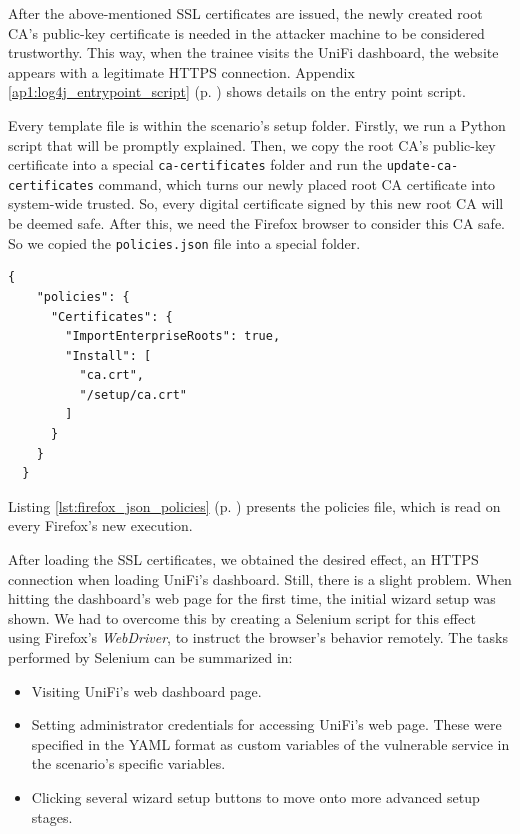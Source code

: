 
After the above-mentioned SSL certificates are issued, the newly created root CA's public-key certificate is needed in the attacker machine to be considered trustworthy. This way, when the trainee visits the UniFi dashboard, the website appears with a legitimate HTTPS connection. Appendix \ref{ap1:log4j_entrypoint_script} (p. \pageref{ap1:log4j_entrypoint_script}) shows details on the entry point script.

Every template file is within the scenario's setup folder. Firstly, we run a Python script that will be promptly explained. Then, we copy the root CA's public-key certificate into a special \texttt{ca-certificates} folder and run the \texttt{update-ca-certificates} command, which turns our newly placed root CA certificate into system-wide trusted. So, every digital certificate signed by this new root CA will be deemed safe. After this, we need the Firefox browser to consider this CA safe. So we copied the \texttt{policies.json} file into a special folder.

\begin{lstlisting}[caption=Firefox's Policies File.,numbers=none,label={lst:firefox_json_policies}]
{
    "policies": {
      "Certificates": {
        "ImportEnterpriseRoots": true,
        "Install": [
          "ca.crt",
          "/setup/ca.crt"
        ]
      }
    }
  }
\end{lstlisting}

Listing \ref{lst:firefox_json_policies} (p. \pageref{lst:firefox_json_policies}) presents the policies file, which is read on every Firefox's new execution.


After loading the SSL certificates, we obtained the desired effect, an HTTPS connection when loading UniFi's dashboard. Still, there is a slight problem. When hitting the dashboard's web page for the first time, the initial wizard setup was shown. We had to overcome this by creating a Selenium script for this effect using Firefox's \textit{WebDriver}, to instruct the browser's behavior remotely. The tasks performed by Selenium can be summarized in:

\begin{itemize}
    \item Visiting UniFi's web dashboard page.
    \item Setting administrator credentials for accessing UniFi's web page. These were specified in the YAML format as custom variables of the vulnerable service in the scenario's specific variables.
    \item Clicking several wizard setup buttons to move onto more advanced setup stages.
\end{itemize}

